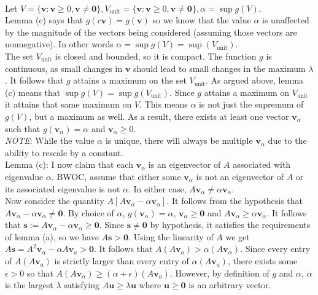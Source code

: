 \documentclass[14pt,letterpaper]{extarticle}
\newcommand*{\bv}{\mathbf{v}}
\newcommand*{\bu}{\mathbf{u}}
\newcommand*{\bvz}{\mathbf{0}}
\begin{document}
\vspace{2mm} \\
Let $V=\{\bv:\bv \ge 0,\bv\ne \bvz\}, V_{\text{unit}}=\{\bv:\bv \ge 0, \bv \ne \bvz\}, \alpha=\sup g(V)$. \\
Lemma (c) says that $g(c\bv)=g(\bv)$ so we know that the value $\alpha$ is unaffected by the magnitude of the vectors being considered (assuming those vectors are nonnegative). In other words $\alpha=\sup g(V)=\sup(V_{\text{unit}})$. \\
The set $V_{\text{unit}}$ is closed and bounded, so it is compact. The function $g$ is continuous, as small changes in $\bv$ should lead to small changes in the maximum $\lambda$. It follows that $g$ attains a maximum on the set $V_{\text{unit}}$. As argued above, lemma (c) means that $\sup g(V)=\sup g(V_{\text{unit}})$. Since $g$ attains a maximum on $V_{\text{unit}}$ it attains that same maximum on $V$. This means $\alpha$ is not just the supremum of $g(V)$, but a maximum as well. As a result, there exists at least one vector $\bv_\alpha$ such that $g(\bv_\alpha)=\alpha$ and $\bv_\alpha \ge 0$. \\
\textit{NOTE}: While the value $\alpha$ is unique, there will always be multiple $\bv_\alpha$ due to the ability to rescale by a constant.
\vspace{2mm} \\
Lemma (c): I now claim that each $\bv_\alpha$ is an eigenvector of $A$ associated with eigenvalue $\alpha$. 
BWOC, assume that either some $\bv_\alpha$ is not an eigenvector of $A$ or its associated eigenvalue is not $\alpha$. In either case, $A\bv_\alpha \ne \alpha\bv_\alpha$. \\
Now consider the quantity $A[A\bv_\alpha-\alpha\bv_\alpha]$.
It follows from the hypothesis that $A\bv_\alpha - \alpha\bv_\alpha\ne \bvz$.
By choice of $\alpha$, $g(\bv_\alpha)=\alpha$, $\bv_\alpha\ge \bvz$ and $A\bv_\alpha \ge \alpha \bv_\alpha$.
It follows that $\mathbf{s}:=A\bv_\alpha -\alpha\bv_\alpha\ge \bvz$.
Since $\mathbf{s}\ne \bvz$ by hypothesis, it satisfies the requirements of lemma (a), so we have $A\mathbf{s}>\bvz$.
Using the linearity of $A$ we get $A\mathbf{s}=A^2\bv_\alpha-\alpha A\bv_a>\bvz$.
It follows that $A(A\bv_a)>\alpha(A\bv_\alpha)$. 
Since every entry of $A(A\bv_a)$ is strictly larger than every entry of $\alpha(A\bv_a)$, there exists some $\epsilon>0$ so that $A(A\bv_\alpha)\ge (\alpha+\epsilon)(A\bv_a)$.
However, by definition of $g$ and $\alpha$, $\alpha$ is the largest $\lambda$ satisfying $A\bu\ge \lambda\bu$ where $\bu \ge \bvz$ is an arbitrary vector.
\end{document}
